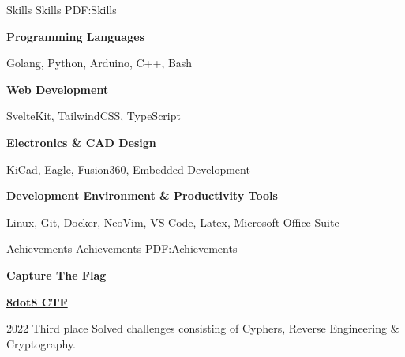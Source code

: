 \documentclass[letterpaper,yyyy,draft]{simpleresumecv}
\begin{document}
\begin{Body}

\Section
{Skills}
{Skills}
{PDF:Skills}
{
    {
        \BulletItem{}
        \textbf{Programming Languages}
        \hfill
        \Gap{}
        \begin{Detail}
        \SubBulletItem{}
        Golang, Python, Arduino, C++, Bash
        \end{Detail}
    }

    {
        \Gap{}
        \BulletItem{}
        \textbf{Web Development}
        \hfill
        \Gap{}
        \begin{Detail}
        \SubBulletItem{}
        SvelteKit, TailwindCSS, TypeScript
        \end{Detail}
    }

    {
        \Gap{}
        \BulletItem{}
        \textbf{Electronics \& CAD Design}
        \hfill
        \Gap{}
        \begin{Detail}
        \SubBulletItem{}
        KiCad, Eagle, Fusion360, Embedded Development
        \end{Detail}
    }

    {
        \Gap{}
        \BulletItem{}
        \textbf{Development Environment \& Productivity Tools}
        \hfill
        \Gap{}
        \begin{Detail}
        \SubBulletItem{}
        Linux, Git, Docker, NeoVim, VS Code, Latex, Microsoft Office Suite
        \end{Detail}
    }
}



\Section
{Achievements}
{Achievements}
{PDF:Achievements}
{
    \Entry{}
    \textbf{Capture The Flag}
    {
        \Gap{}
        \BulletItem{}
        \href{https://8dot8.org}{\textbf{8dot8 CTF}}
        \hfill
        \begin{Detail}
        \SubBulletItem{}
        2022 \- Third place \- Solved challenges consisting of Cyphers, Reverse Engineering \& Cryptography.
        \end{Detail}
    }

}
\end{Body}
\end{document}
